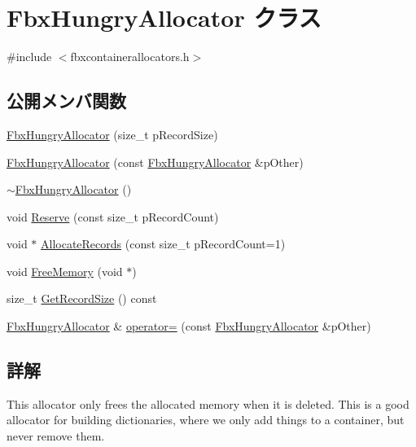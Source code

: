 \hypertarget{class_fbx_hungry_allocator}{}\section{Fbx\+Hungry\+Allocator クラス}
\label{class_fbx_hungry_allocator}


{\ttfamily \#include $<$fbxcontainerallocators.\+h$>$}

\subsection*{公開メンバ関数}
\begin{DoxyCompactItemize}
\item 
\hyperlink{class_fbx_hungry_allocator_a194f8edf036580f3652dcbd84f09c5c2}{Fbx\+Hungry\+Allocator} (size\+\_\+t p\+Record\+Size)
\item 
\hyperlink{class_fbx_hungry_allocator_aa97f29518f4a71ac45f0784f6a4c66b7}{Fbx\+Hungry\+Allocator} (const \hyperlink{class_fbx_hungry_allocator}{Fbx\+Hungry\+Allocator} \&p\+Other)
\item 
\hyperlink{class_fbx_hungry_allocator_a05e40ed81ef8cde223014ed5471d8586}{$\sim$\+Fbx\+Hungry\+Allocator} ()
\item 
void \hyperlink{class_fbx_hungry_allocator_a8aeb6180f5d6ce87b57d0505520144b5}{Reserve} (const size\+\_\+t p\+Record\+Count)
\item 
void $\ast$ \hyperlink{class_fbx_hungry_allocator_a89f760df090e671f74361a3c64b5fccd}{Allocate\+Records} (const size\+\_\+t p\+Record\+Count=1)
\item 
void \hyperlink{class_fbx_hungry_allocator_a1c06ce521e51ae99b671daa3c308e0b0}{Free\+Memory} (void $\ast$)
\item 
size\+\_\+t \hyperlink{class_fbx_hungry_allocator_a6aa8fde93ff214d3313ec29abe6b2eb2}{Get\+Record\+Size} () const
\item 
\hyperlink{class_fbx_hungry_allocator}{Fbx\+Hungry\+Allocator} \& \hyperlink{class_fbx_hungry_allocator_a692a8e4e268a60d82be5469e6e8c232f}{operator=} (const \hyperlink{class_fbx_hungry_allocator}{Fbx\+Hungry\+Allocator} \&p\+Other)
\end{DoxyCompactItemize}


\subsection{詳解}
This allocator only frees the allocated memory when it is deleted. This is a good allocator for building dictionaries, where we only add things to a container, but never remove them. 

